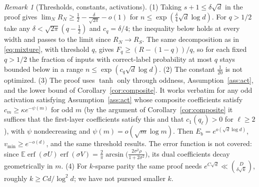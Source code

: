 \documentclass[11pt]{article}
\theoremstyle{definition}\newtheorem{assumption}[theorem]{Assumption}
\theoremstyle{remark}\newtheorem{remark}[theorem]{Remark}
\newcommand{\E}{\mathbb E}
\begin{document}
\begin{remark}[Thresholds, constants, activations]\label{rem:activations}
(1) Taking $s+1\le\delta\sqrt d$ in the proof gives
$\lim_NR_N\ge\frac12-\frac\delta{\sqrt{2\pi}}-o(1)$ for
$n\le\exp(\frac\delta4\sqrt d\log d)$. For $q>1/2$ take any $\delta<\sqrt{2\pi}(q-\frac12)$ and $c_q=\delta/4$; the inequality below holds at every width and passes to the limit since $R_N\to R_S$. The same decomposition as in \eqref{eq:mixture}, with threshold $q$,
gives $F_q\ge(R-(1-q))/q$, so for each fixed $q>1/2$ the
fraction of inputs with correct-label probability at most $q$ stays
bounded below in a range $n\le\exp(c_q\sqrt d\log d)$. (2) The constant
$\frac1{20}$ is not optimized. (3) The proof uses $\tanh$ only through
oddness, Assumption~\ref{ass:act}, and the lower bound of
Corollary~\ref{cor:composite}. It works verbatim for any odd activation
satisfying Assumption~\ref{ass:act} whose composite coefficients satisfy
$c_m\ge\kappa e^{-\psi(m)}$ for odd $m$ (by the argument of
Corollary~\ref{cor:composite} it suffices that the first-layer coefficients
satisfy this and that $c_1(q_\ell)>0$ for $\ell\ge2$), with $\psi$ nondecreasing and
$\psi(m)=o(\sqrt m\log m)$. Then $E_b=e^{o(\sqrt d\log d)}$,
$v_{\min}\ge e^{-o(d)}$, and the same threshold results. The error function is not covered: since
$\E\operatorname{erf}(\sigma U)\operatorname{erf}(\sigma V)=\frac2\pi
\arcsin\bigl(\frac{2\sigma^2\rho}{1+2\sigma^2}\bigr)$, its dual
coefficients decay geometrically in $m$. (4) For $k$-sparse
parity the same proof needs
$e^{C\sqrt d}\ll\binom D{\delta\sqrt k}$, roughly
$k\ge Cd/\log^2d$; we have not pursued smaller $k$.
\end{remark}


\end{document}

